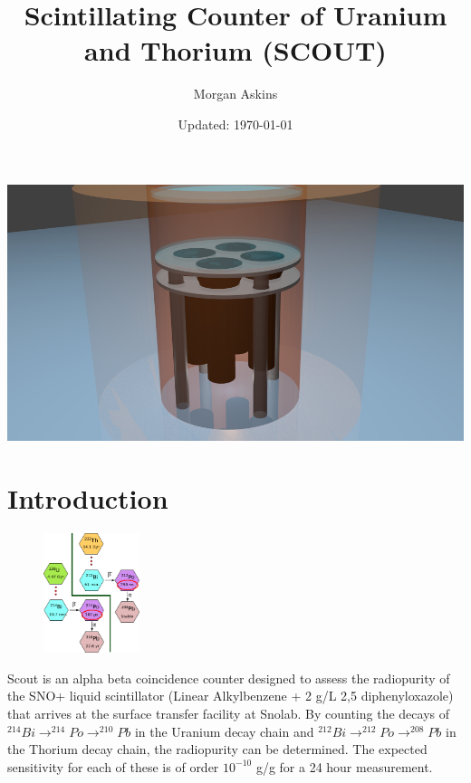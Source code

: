 \documentclass[]{article}
\title{Scintillating Counter of Uranium and Thorium (SCOUT)}
\author{Morgan Askins}
\date{Updated: \today}
\begin{document}
\maketitle
\begin{center}    
\includegraphics[width=0.8\linewidth]{scout_render.png}
\end{center}
\section{Introduction}
\begin{figure}
  \centering
  \includegraphics[width=0.25\textwidth]{DecayChain.pdf}
\end{figure}
Scout is an alpha beta coincidence counter designed to assess the radiopurity of the SNO+
liquid scintillator (Linear Alkylbenzene + 2 g/L 2,5 diphenyloxazole) that arrives
at the surface transfer facility at Snolab. By counting the decays of 
$^{214}Bi\rightarrow^{214}Po\rightarrow^{210}Pb$ in the Uranium decay chain and 
$^{212}Bi\rightarrow^{212}Po\rightarrow^{208}Pb$ in the Thorium decay chain, the
radiopurity can be determined. The expected sensitivity for each of these is of
order $10^{-10}$ g/g for a 24 hour measurement.
\end{document}
